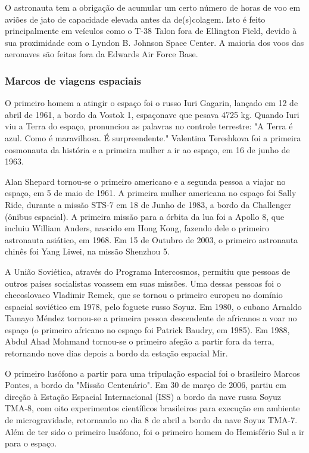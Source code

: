 \documentclass[a4paper,10pt]{article}
\begin{document}
O astronauta tem a obrigação de acumular um certo número de horas de voo em aviões de jato de capacidade elevada antes da de(s)colagem. Isto é feito principalmente em veículos como o T-38 Talon fora de Ellington Field, devido à sua proximidade com o Lyndon B. Johnson Space Center. A maioria dos voos das aeronaves são feitas fora da Edwards Air Force Base.
\subsubsection{Marcos de viagens espaciais}
O primeiro homem a atingir o espaço foi o russo Iuri Gagarin, lançado em 12 de abril de 1961, a bordo da Vostok 1, espaçonave que pesava 4725 kg. Quando Iuri viu a Terra do espaço, pronunciou as palavras no controle terrestre: "A Terra é azul. Como é maravilhosa. É surpreendente." Valentina Tereshkova foi a primeira cosmonauta da história e a primeira mulher a ir ao espaço, em 16 de junho de 1963.

Alan Shepard tornou-se o primeiro americano e a segunda pessoa a viajar no espaço, em 5 de maio de 1961. A primeira mulher americana no espaço foi Sally Ride, durante a missão STS-7 em 18 de Junho de 1983, a bordo da Challenger (ônibus espacial). A primeira missão para a órbita da lua foi a Apollo 8, que incluiu William Anders, nascido em Hong Kong, fazendo dele o primeiro astronauta asiático, em 1968. Em 15 de Outubro de 2003, o primeiro astronauta chinês foi Yang Liwei, na missão Shenzhou 5.

A União Soviética, através do Programa Intercosmos, permitiu que pessoas de outros países socialistas voassem em suas missões. Uma dessas pessoas foi o checoslovaco Vladimir Remek, que se tornou o primeiro europeu no domínio espacial soviético em 1978, pelo foguete russo Soyuz. Em 1980, o cubano Arnaldo Tamayo Méndez tornou-se a primeira pessoa descendente de africanos a voar no espaço (o primeiro africano no espaço foi Patrick Baudry, em 1985). Em 1988, Abdul Ahad Mohmand tornou-se o primeiro afegão a partir fora da terra, retornando nove dias depois a bordo da estação espacial Mir.

O primeiro lusófono a partir para uma tripulação espacial foi o brasileiro Marcos Pontes, a bordo da "Missão Centenário". Em 30 de março de 2006, partiu em direção à Estação Espacial Internacional (ISS) a bordo da nave russa Soyuz TMA-8, com oito experimentos científicos brasileiros para execução em ambiente de microgravidade, retornando no dia 8 de abril a bordo da nave Soyuz TMA-7. Além de ter sido o primeiro lusófono, foi o primeiro homem do Hemisfério Sul a ir para o espaço. 
\end{document}
